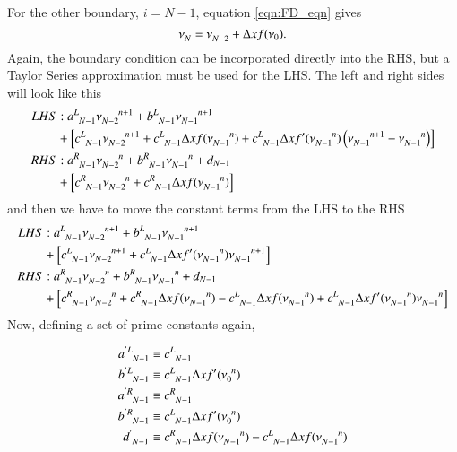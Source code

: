\documentclass[letterpaper,12pt]{article}
\newcommand \bcf{f}
\begin{document}
For the other boundary, $i = N-1$, equation \ref{eqn:FD_eqn} gives
\begin{equation}
  \nu\indices{_{N}} =  \nu\indices{_{N-2}}  + \Delta x \bcf(\nu_0).
\end{equation}
Again, the boundary condition can be incorporated directly into the RHS, but a Taylor Series approximation must
be used for the LHS. The left and right sides will look like this
\begin{align}
 LHS&:
  a\indices{^L_{N-1}} \nu\indices{_{N-2}^{n+1}}
+ b\indices{^L_{N-1}} \nu\indices{_{N-1}^{n+1}} \nonumber \\
&+
\left[
  c\indices{^L_{N-1}} \nu\indices{_{N-2}^{n+1}}
+ c\indices{^L_{N-1}} \Delta x \bcf (\nu\indices{_{N-1}^{n}})
+ c\indices{^L_{N-1}} \Delta x \bcf'(\nu\indices{_{N-1}^{n}})\left(  \nu\indices{_{N-1}^{n+1}} - \nu\indices{_{N-1}^{n}} \right)
\right] \nonumber \\
  RHS&:
  a\indices{^R_{N-1}} \nu\indices{_{N-2}^{n  }}
+ b\indices{^R_{N-1}} \nu\indices{_{N-1}^{n  }}
+ d_{N-1} \nonumber \\
&+ \left[
  c\indices{^R_{N-1}} \nu\indices{_{N-2}^n}                  %
+ c\indices{^R_{N-1}} \Delta x \bcf(\nu\indices{_{N-1}^n})  %
\right] \nonumber
\end{align}
and then we have to move the constant terms from the LHS to the RHS
\begin{align}
  \label{eqn:maxLHS}
 LHS&:
  a\indices{^L_{N-1}} \nu\indices{_{N-2}^{n+1}}
+ b\indices{^L_{N-1}} \nu\indices{_{N-1}^{n+1}} \nonumber \\
&+
\left[
  c\indices{^L_{N-1}} \nu\indices{_{N-2}^{n+1}}
+ c\indices{^L_{N-1}} \Delta x \bcf'(\nu\indices{_{N-1}^{n}}) \nu\indices{_{N-1}^{n+1}}
\right] \\
  \label{eqn:maxRHS}
  RHS&:
  a\indices{^R_{N-1}} \nu\indices{_{N-2}^{n  }}
+ b\indices{^R_{N-1}} \nu\indices{_{N-1}^{n  }}
+ d_{N-1} \nonumber \\
&+ \left[
  c\indices{^R_{N-1}} \nu\indices{_{N-2}^n}
+ c\indices{^R_{N-1}} \Delta x \bcf(\nu\indices{_{N-1}^n})
- c\indices{^L_{N-1}} \Delta x \bcf (\nu\indices{_{N-1}^{n}})
+ c\indices{^L_{N-1}} \Delta x \bcf'(\nu\indices{_{N-1}^{n}}) \nu\indices{_{N-1}^{n}}
\right]
\end{align}
Now, defining a set of prime constants again,

\begin{align}
  a\indices{^{'L}_{N-1}} &\equiv    c\indices{^L_{N-1}} \\
  b\indices{^{'L}_{N-1}} &\equiv    c\indices{^L_{N-1}} \Delta x \bcf'(\nu\indices{_0^n}) \\
  a\indices{^{'R}_{N-1}} &\equiv    c\indices{^R_{N-1}} \\
  b\indices{^{'R}_{N-1}} &\equiv    c\indices{^L_{N-1}} \Delta x \bcf'(\nu\indices{_0^n}) \\
  d\indices{^{' }_{N-1}} &\equiv    c\indices{^R_{N-1}} \Delta x \bcf(\nu\indices{_{N-1}^n}) - c\indices{^L_{N-1}} \Delta x \bcf (\nu\indices{_{N-1}^{n}})
\end{align}
\end{document}
